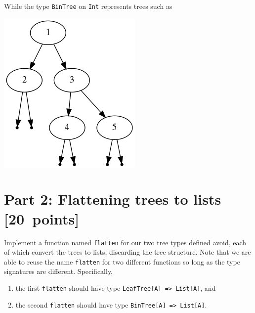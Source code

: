 \documentclass[11pt]{article}
\begin{document}
While the type \texttt{BinTree} on \texttt{Int} represents trees such as
\begin{center}
\includegraphics[width=\textwidth]{media/BinTree.png}
\end{center}

\section*{Part 2: Flattening trees to lists          [20 points]}
\label{sec:org3d58f6c}
Implement a function named \texttt{flatten} for our two tree types
defined avoid, each of which convert the trees to lists,
discarding the tree structure.
Note that we are able to reuse the name \texttt{flatten} for two different
functions so long as the type signatures are different.
Specifically,
\begin{enumerate}
\item the first \texttt{flatten} should have type \texttt{LeafTree[A] => List[A]}, and
\item the second \texttt{flatten} should have type \texttt{BinTree[A] => List[A]}.
\end{enumerate}
\end{document}
